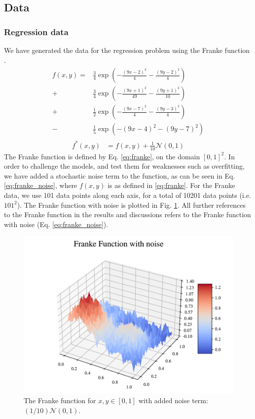 \subsection{Data}
\subsubsection{Regression data}
We have generated the data for the regression problem using the Franke function \citep[p. 13]{frank}.
\begin{align}
\begin{split}\label{eq:franke}
    f(x, y) = &\frac{3}{4} \exp\left( -\frac{(9x - 2)^2}{4} - \frac{(9y - 2)^2}{4} \right) \\
    + &\frac{3}{4} \exp\left( -\frac{(9x + 1)^2}{49} - \frac{(9y + 1)^2}{10} \right)  \\
    + &\frac{1}{2} \exp\left( -\frac{(9x - 7)^2}{4} - \frac{(9y - 3)^2}{4} \right)  \\
    - &\frac{1}{5} \exp\left( -(9x - 4)^2 - (9y - 7)^2 \right)
\end{split}
\end{align}
\begin{align}\label{eq:franke_noise}
    f^*(x,y) &= f(x, y) + \frac{1}{10} \mathcal{N}(0, 1)
\end{align}
The Franke function is defined by Eq. \ref{eq:franke}, on the domain $[0, 1]^2$. 
In order to challenge the models, and test them for weaknesses such as overfitting, we have added a stochastic noise term to the function, as can be seen in Eq. \ref{eq:franke_noise}, where $f(x,y)$ is as defined in \ref{eq:franke}.
For the Franke data, we use 101 data points along each axis, for a total of 10201 data points (i.e. $101^2$).
The Franke function with noise is plotted in Fig. \ref{fig:franke_noise}.
All further references to the Franke function in the results and discussions refers to the Franke function with noise (Eq. \ref{eq:franke_noise}).

\begin{figure}[h!]
\centering
\includegraphics[width=1\linewidth]{project_2/figures/franke_func_noise.pdf}
\caption{The Franke function for $x,y \in [0,1]$ with added noise term: $(1/10) \mathcal{N}(0, 1)$.}
\label{fig:franke_noise}
\end{figure}

